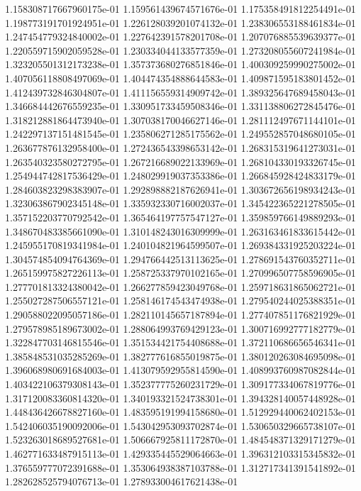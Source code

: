 1.158308717667960175e-01
1.159561439674571676e-01
1.175358491812254491e-01
1.198773191701924951e-01
1.226128039201074132e-01
1.238306553188461834e-01
1.247454779324840002e-01
1.227642391578201708e-01
1.207076885539639377e-01
1.220559715902059528e-01
1.230334044133577359e-01
1.273208055607241984e-01
1.323205501312173238e-01
1.357373680276851846e-01
1.400309259990275002e-01
1.407056118808497069e-01
1.404474354888644583e-01
1.409871595183801452e-01
1.412439732846304807e-01
1.411156559314909742e-01
1.389325647689458043e-01
1.346684442676559235e-01
1.330951733459508346e-01
1.331138806272845476e-01
1.318212881864473940e-01
1.307038170046627146e-01
1.281112497671144101e-01
1.242297137151481545e-01
1.235806271285175562e-01
1.249552857048680105e-01
1.263677876132958400e-01
1.272436543398653142e-01
1.268315319641273031e-01
1.263540323580272795e-01
1.267216689022133969e-01
1.268104330193326745e-01
1.254944742817536429e-01
1.248029919037353386e-01
1.266845928424833179e-01
1.284603823298383907e-01
1.292898882187626941e-01
1.303672656198934243e-01
1.323063867902345148e-01
1.335932330716002037e-01
1.345422365221278505e-01
1.357152203770792542e-01
1.365464197757547127e-01
1.359859766149889293e-01
1.348670483385661090e-01
1.310148243016309999e-01
1.263163461833615442e-01
1.245955170819341984e-01
1.240104821964599507e-01
1.269384331925203224e-01
1.304574854094764369e-01
1.294766442513113625e-01
1.278691543760352711e-01
1.265159975827226113e-01
1.258725337970102165e-01
1.270996507758596905e-01
1.277701813324380042e-01
1.266277859423049768e-01
1.259718631865062721e-01
1.255027287506557121e-01
1.258146174543474938e-01
1.279540244025388351e-01
1.290588022095057186e-01
1.282110145657187894e-01
1.277407851176821929e-01
1.279578985189673002e-01
1.288064993769429123e-01
1.300716992777182779e-01
1.322847703146815546e-01
1.351534421754408688e-01
1.372110686656546341e-01
1.385848531035285269e-01
1.382777616855019875e-01
1.380120263084695098e-01
1.396068980691684003e-01
1.413079592955814590e-01
1.408993760987082844e-01
1.403422106379308143e-01
1.352377775260231729e-01
1.309177334067819776e-01
1.317120083360814320e-01
1.340193321524738301e-01
1.394328140057448928e-01
1.448436426678827160e-01
1.483595191994158680e-01
1.512929440062402153e-01
1.542406035190092006e-01
1.543042953093702874e-01
1.530650329665738107e-01
1.523263018689527681e-01
1.506667925811172870e-01
1.484548371329171279e-01
1.462771633487915113e-01
1.429335445529064663e-01
1.396312103315345832e-01
1.376559777072391688e-01
1.353064938387103788e-01
1.312717341391541892e-01
1.282628525794076713e-01
1.278933004617621438e-01
